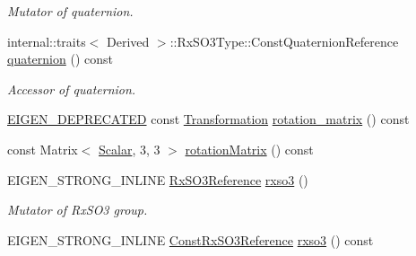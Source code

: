\begin{DoxyCompactItemize}
\begin{DoxyCompactList}\small\item\em Mutator of quaternion. \end{DoxyCompactList}\item 
internal\+::traits$<$ Derived $>$\+::Rx\+S\+O3\+Type\+::\+Const\+Quaternion\+Reference \hyperlink{class_sophus_1_1_sim3_group_base_a1c9089b2ac5d29261b1665f8e5c19876}{quaternion} () const \hypertarget{class_sophus_1_1_sim3_group_base_a1c9089b2ac5d29261b1665f8e5c19876}{}\label{class_sophus_1_1_sim3_group_base_a1c9089b2ac5d29261b1665f8e5c19876}

\begin{DoxyCompactList}\small\item\em Accessor of quaternion. \end{DoxyCompactList}\item 
\hyperlink{class_sophus_1_1_rx_s_o3_group}{E\+I\+G\+E\+N\+\_\+\+D\+E\+P\+R\+E\+C\+A\+T\+ED} const \hyperlink{class_sophus_1_1_sim3_group_base_a93c8c564e3386709dc4cb2fc6d451dd8}{Transformation} \hyperlink{class_sophus_1_1_sim3_group_base_a89e95392c0cd09d50c6035acd7101677}{rotation\+\_\+matrix} () const 
\item 
const Matrix$<$ \hyperlink{class_sophus_1_1_sim3_group_base_abcf3d57b9fcc425bbc367a85a45a8092}{Scalar}, 3, 3 $>$ \hyperlink{class_sophus_1_1_sim3_group_base_aa65d0a5e41074a979e574bf6aac62694}{rotation\+Matrix} () const 
\item 
E\+I\+G\+E\+N\+\_\+\+S\+T\+R\+O\+N\+G\+\_\+\+I\+N\+L\+I\+NE \hyperlink{class_sophus_1_1_sim3_group_base_a12827cf23c0ef3b94adbb088e8be891e}{Rx\+S\+O3\+Reference} \hyperlink{class_sophus_1_1_sim3_group_base_a352ae52574d5686aa113e008d95ebb64}{rxso3} ()\hypertarget{class_sophus_1_1_sim3_group_base_a352ae52574d5686aa113e008d95ebb64}{}\label{class_sophus_1_1_sim3_group_base_a352ae52574d5686aa113e008d95ebb64}

\begin{DoxyCompactList}\small\item\em Mutator of Rx\+S\+O3 group. \end{DoxyCompactList}\item 
E\+I\+G\+E\+N\+\_\+\+S\+T\+R\+O\+N\+G\+\_\+\+I\+N\+L\+I\+NE \hyperlink{class_sophus_1_1_sim3_group_base_ae170af2cf9301830de6fac478b322498}{Const\+Rx\+S\+O3\+Reference} \hyperlink{class_sophus_1_1_sim3_group_base_a45c09e43e821147ec1a33efda4d92b7b}{rxso3} () const \hypertarget{class_sophus_1_1_sim3_group_base_a45c09e43e821147ec1a33efda4d92b7b}{}\label{class_sophus_1_1_sim3_group_base_a45c09e43e821147ec1a33efda4d92b7b}


\end{DoxyCompactItemize}
